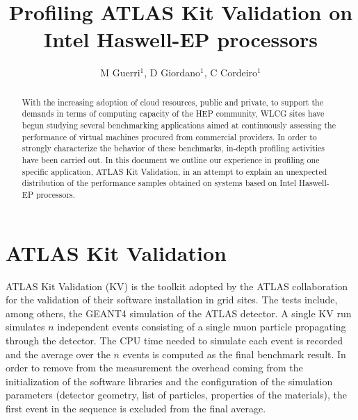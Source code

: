 \documentclass[a4paper]{jpconf}
\begin{document}
\title{Profiling ATLAS Kit Validation on \newline Intel Haswell-EP processors}

\author{M Guerri$^1$, D Giordano$^1$, C Cordeiro$^1$}
\address{$^1$ CERN}



\begin{abstract}
With the increasing adoption of cloud resources, public and private, to support
the demands in terms of computing capacity of the HEP community, WLCG sites have begun
studying several benchmarking applications aimed at continuously assessing the
performance of virtual machines procured from commercial providers.
In order to strongly characterize the behavior of these benchmarks, in-depth
profiling activities have been carried out. In this document we outline
our experience in profiling one specific application, ATLAS Kit Validation,
in an attempt to explain an unexpected distribution of the performance samples
obtained on systems based on Intel Haswell-EP processors.
\end{abstract}

\section{ATLAS Kit Validation}
ATLAS Kit Validation (KV) is the toolkit adopted by the ATLAS collaboration for the
validation of their software installation in grid sites. The tests include, among
others, the GEANT4 simulation of the ATLAS detector. A single KV run simulates
$n$ independent events consisting of a single muon particle propagating through
the detector. The CPU time needed to simulate each event is recorded and the
average over the $n$ events is computed as the final benchmark result. In order to
remove from the measurement the overhead coming from the initialization of the
software libraries and the configuration of the simulation parameters (detector
geometry, list of particles, properties of the materials), the first event in the
sequence is excluded from the final average.
\end{document}
